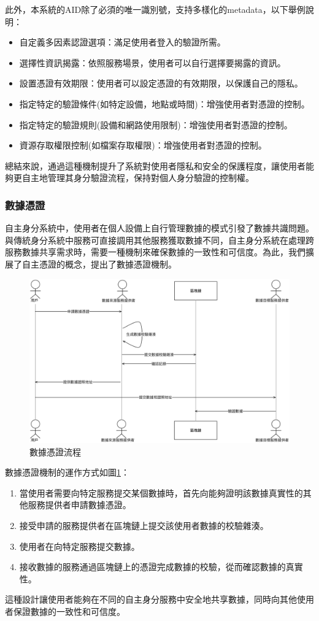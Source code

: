 此外，本系統的AID除了必須的唯一識別號，支持多樣化的metadata，以下舉例說明：
\begin{itemize}
  \item 自定義多因素認證選項：滿足使用者登入的驗證所需。
  \item 選擇性資訊揭露：依照服務場景，使用者可以自行選擇要揭露的資訊。
  \item 設置憑證有效期限：使用者可以設定憑證的有效期限，以保護自己的隱私。
  \item 指定特定的驗證條件(如特定設備，地點或時間)：增強使用者對憑證的控制。
  \item 指定特定的驗證規則(設備和網路使用限制)：增強使用者對憑證的控制。
  \item 資源存取權限控制(如檔案存取權限)：增強使用者對憑證的控制。
\end{itemize}

總結來說，通過這種機制提升了系統對使用者隱私和安全的保護程度，讓使用者能夠更自主地管理其身分驗證流程，保持對個人身分驗證的控制權。
\subsubsection{數據憑證}
自主身分系統中，使用者在個人設備上自行管理數據的模式引發了數據共識問題。與傳統身分系統中服務可直接調用其他服務獲取數據不同，自主身分系統在處理跨服務數據共享需求時，需要一種機制來確保數據的一致性和可信度。為此，我們擴展了自主憑證的概念，提出了數據憑證機制。
\begin{figure}
  \centering
  \includegraphics[width=\linewidth,keepaspectratio]{figures/flow-dc.png}
  \caption{數據憑證流程}
  \label{fig:flow-dc}
\end{figure}
數據憑證機制的運作方式如圖\ref{fig:flow-dc}：
\begin{enumerate}
  \item 當使用者需要向特定服務提交某個數據時，首先向能夠證明該數據真實性的其他服務提供者申請數據憑證。
  \item 接受申請的服務提供者在區塊鏈上提交該使用者數據的校驗雜湊。
  \item 使用者在向特定服務提交數據。
  \item 接收數據的服務通過區塊鏈上的憑證完成數據的校驗，從而確認數據的真實性。
\end{enumerate}
這種設計讓使用者能夠在不同的自主身分服務中安全地共享數據，同時向其他使用者保證數據的一致性和可信度。

